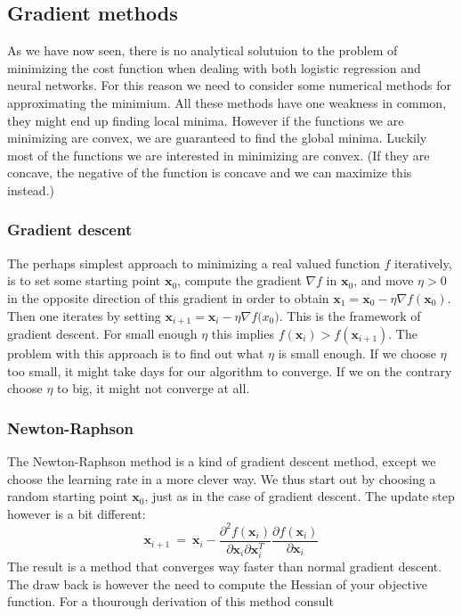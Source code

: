 \documentclass[a4paper,english]{article}
\begin{document}
\subsection{Gradient methods}
As we have now seen, there is no analytical solutuion to the problem
of minimizing the cost function when dealing with both logistic regression
and neural networks. For this reason we need to consider some numerical 
methods for approximating the minimium. All these methods have one 
weakness in common, they might end up finding local minima. However 
if the functions we are minimizing are convex, we are guaranteed to find
the global minima. Luckily most of the functions we are interested in
minimizing are convex. (If they are concave, the negative of the function
is concave and we can maximize this instead.)

\subsubsection{Gradient descent}
The perhaps simplest approach to minimizing a real valued function
$f$ iteratively, is to set some starting point $\bm{x}_0$, compute the gradient
$\nabla f$ in $\bm{x}_0$, and move $\eta > 0$ in the opposite direction of 
this gradient in order to obtain 
$\bm{x}_1 = \bm{x}_0 - \eta \nabla f(\bm{x}_0)$. Then
one iterates by setting 
$\bm{x}_{i+1} = \bm{x}_i - \eta \nabla f\bm{(}x_0)$. 
This is the framework of gradient descent.
For small enough $\eta$ this implies $f(\bm{x}_i) > f(\bm{x}_{i+1})$. 
The problem with this approach is to find out what 
$\eta$ is small enough. If we choose
$\eta$ too small, it might take days for our algorithm to converge. If 
we on the contrary choose $\eta$ to big, it might not converge at all.

\subsubsection{Newton-Raphson}
The Newton-Raphson method is a kind of gradient descent method, 
except we choose the learning rate in a more clever way. We thus 
start out by choosing a random starting point $\bm{x}_0$, just as in the 
case of gradient descent. The update step however is a bit different:
\begin{equation}
    \bm{x}_{i+1} \ = \ \bm{x}_{i} - 
    \frac{\partial^2 f(\bm{x}_i)}{\partial \bm{x}_i \partial \bm{x}_i^T} 
    \frac{\partial f(\bm{x}_i)}{\partial \bm{x}_i}
\end{equation}
The result is a method that converges way faster than normal gradient 
descent. The draw back is however the need to compute the Hessian of 
your objective function. For a thourough derivation of this method 
consult \cite{gradient}
\end{document}
